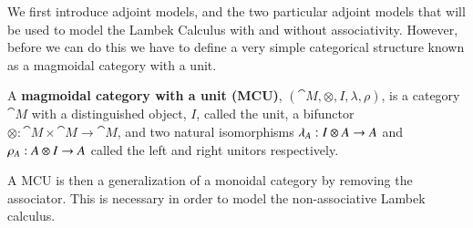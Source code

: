 We first introduce adjoint models, and the two particular adjoint
models that will be used to model the Lambek Calculus with and without
associativity.  However, before we can do this we have to define a
very simple categorical structure known as a magmoidal category with a
unit.
\begin{definition}
  \label{def:magmoidal-categories}
  A \textbf{magmoidal category with a unit (MCU)}, $(\cat{M}, \otimes,
  I, \lambda,\rho)$, is a category $\cat{M}$ with a distinguished object,
  $I$, called the unit, a bifunctor $\otimes : \cat{M} \times \cat{M}
  \to \cat{M}$, and two natural isomorphisms $\lambda_A : I \otimes A \rightarrow
  A$ and $\rho_A : A \otimes I \rightarrow A$ called the left and right unitors
  respectively.
\end{definition}
\noindent
A MCU is then a generalization of a monoidal category by removing the
associator.  This is necessary in order to model the non-associative
Lambek calculus.

